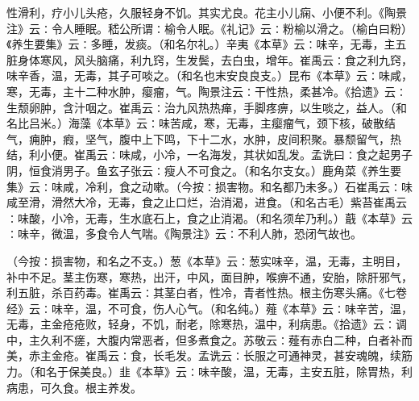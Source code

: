 \documentclass[a4paper,12pt,UTF8,twoside]{ctexbook}
\begin{document}
性滑利，疗小儿头疮，久服轻身不饥。其实尤良。花主小儿痫、小便不利。《陶景注》云∶令人睡眠。嵇公所谓∶榆令人眠。《礼记》云∶粉榆以滑之。（榆白曰粉）《养生要集》云∶多睡，发痰。（和名尔礼。）辛夷《本草》云∶味辛，无毒，主五脏身体寒风，风头脑痛，利九窍，生发鬓，去白虫，增年。崔禹云∶食之利九窍，味辛香，温，无毒，其子可啖之。（和名也末安良良支。）昆布《本草》云∶味咸，寒，无毒，主十二种水肿，瘿瘤，气。陶景注云∶干性热，柔甚冷。《拾遗》云∶生颓卵肿，含汁咽之。崔禹云∶治九风热热瘅，手脚疼痹，以生啖之，益人。（和名比吕米。）海藻《本草》云∶味苦咸，寒，无毒，主瘿瘤气，颈下核，破散结气，痈肿，瘕，坚气，腹中上下鸣，下十二水，水肿，皮间积聚。暴颓留气，热结，利小便。崔禹云∶味咸，小冷，一名海发，其状如乱发。孟诜曰∶食之起男子阴，恒食消男子。鱼玄子张云∶瘦人不可食之。（和名尔支女。）鹿角菜《养生要集》云∶味咸，冷利，食之动嗽。（今按∶损害物。和名都乃未多。）石崔禹云∶味咸至滑，滑然大冷，无毒，食之止口烂，治消渴，进食。（和名古毛）紫苔崔禹云∶味酸，小冷，无毒，生水底石上，食之止消渴。（和名须牟乃利。）蕺《本草》云∶味辛，微温，多食令人气喘。《陶景注》云∶不利人肺，恐闭气故也。

（今按∶损害物，和名之不支。）葱《本草》云∶葱实味辛，温，无毒，主明目，补中不足。茎主伤寒，寒热，出汗，中风，面目肿，喉痹不通，安胎，除肝邪气，利五脏，杀百药毒。崔禹云∶其茎白者，性冷，青者性热。根主伤寒头痛。《七卷经》云∶味辛，温，不可食，伤人心气。（和名纯。）薤《本草》云∶味辛苦，温，无毒，主金疮疮败，轻身，不饥，耐老，除寒热，温中，利病患。《拾遗》云∶调中，主久利不瘥，大腹内常恶者，但多煮食之。苏敬云∶薤有赤白二种，白者补而美，赤主金疮。崔禹云∶食，长毛发。孟诜云∶长服之可通神灵，甚安魂魄，续筋力。（和名于保美良。）韭《本草》云∶味辛酸，温，无毒，主安五脏，除胃热，利病患，可久食。根主养发。
\end{document}
